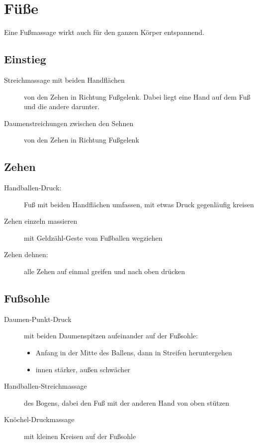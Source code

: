 \section{Füße}

Eine Fußmassage wirkt auch für den ganzen Körper entspannend.

\subsection{Einstieg}
\begin{description}
  \item[Streichmassage mit beiden Handflächen] von den Zehen in Richtung Fußgelenk. Dabei liegt eine Hand auf dem Fuß und die andere darunter.
  \item[Daumenstreichungen zwischen den Sehnen] von den Zehen in Richtung Fußgelenk
\end{description}

\subsection{Zehen}
\begin{description}
  \item[Handballen-Druck:] Fuß mit beiden Handflächen umfassen, mit etwas Druck gegenläufig kreisen
  \item[Zehen einzeln massieren] mit Geldzähl-Geste vom Fußballen wegziehen
  \item[Zehen dehnen:] alle Zehen auf einmal greifen und nach oben drücken
\end{description}

\subsection{Fußsohle}
\begin{description}
\item[Daumen-Punkt-Druck] mit beiden Daumenspitzen aufeinander auf der Fußsohle:
  \begin{itemize}
    \item Anfang in der Mitte des Ballens, dann in Streifen heruntergehen
    \item innen stärker, außen schwächer
  \end{itemize}
\item[Handballen-Streichmassage] des Bogens, dabei den Fuß mit der anderen Hand von oben stützen
\item[Knöchel-Druckmassage] mit kleinen Kreisen auf der Fußsohle
\end{description}

